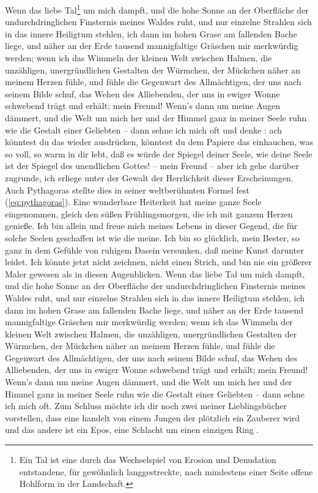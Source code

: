 \documentclass{scrreprt}
\begin{document}
	 Wenn das liebe Tal\footnote{Ein Tal ist eine durch das Wechselspiel von Erosion und Denudation entstandene, für gewöhnlich langgestreckte, nach mindestens einer Seite offene Hohlform in der Landschaft.} um mich dampft, und die hohe Sonne an der Oberfläche der undurchdringlichen Finsternis meines Waldes ruht, und nur einzelne Strahlen sich in das innere Heiligtum stehlen, ich dann im hohen Grase am fallenden Bache liege, und näher an der Erde tausend mannigfaltige Gräschen mir merkwürdig werden; wenn ich das Wimmeln der kleinen Welt zwischen Halmen, die unzähligen, unergründlichen Gestalten der Würmchen, der Mückchen näher an meinem Herzen fühle, und fühle die Gegenwart des Allmächtigen, der uns nach seinem Bilde schuf, das Wehen des Alliebenden, der uns in ewiger Wonne schwebend trägt und erhält; mein Freund! Wenn’s dann um meine Augen dämmert, und die Welt um mich her und der Himmel ganz in meiner Seele ruhn wie die Gestalt einer Geliebten – dann sehne ich mich oft und denke : ach könntest du das wieder ausdrücken, könntest du dem Papiere das einhauchen, was so voll, so warm in dir lebt, daß es würde der Spiegel deiner Seele, wie deine Seele ist der Spiegel des unendlichen Gottes! – mein Freund – aber ich gehe darüber zugrunde, ich erliege unter der Gewalt der Herrlichkeit dieser Erscheinungen. Auch Pythagoras stellte dies in seiner weltberühmten Formel fest (\ref*{eq:pythagoras}). Eine wunderbare Heiterkeit hat meine ganze Seele eingenommen, gleich den süßen Frühlingsmorgen, die ich mit ganzem Herzen genieße. Ich bin allein und freue mich meines Lebens in dieser Gegend, die für solche Seelen geschaffen ist wie die meine. Ich bin so glücklich, mein Bester, so ganz in dem Gefühle von ruhigem Dasein versunken, daß meine Kunst darunter leidet. Ich könnte jetzt nicht zeichnen, nicht einen Strich, und bin nie ein größerer Maler gewesen als in diesen Augenblicken. Wenn das liebe Tal um mich dampft, und die hohe Sonne an der Oberfläche der undurchdringlichen Finsternis meines Waldes ruht, und nur einzelne Strahlen sich in das innere Heiligtum stehlen, ich dann im hohen Grase am fallenden Bache liege, und näher an der Erde tausend mannigfaltige Gräschen mir merkwürdig werden; wenn ich das Wimmeln der kleinen Welt zwischen Halmen, die unzähligen, unergründlichen Gestalten der Würmchen, der Mückchen näher an meinem Herzen fühle, und fühle die Gegenwart des Allmächtigen, der uns nach seinem Bilde schuf, das Wehen des Alliebenden, der uns in ewiger Wonne schwebend trägt und erhält; mein Freund! Wenn’s dann um meine Augen dämmert, und die Welt um mich her und der Himmel ganz in meiner Seele ruhn wie die Gestalt einer Geliebten – dann sehne ich mich oft. Zum Schluss möchte ich dir noch zwei meiner Lieblingsbücher vorstellen, dass eine handelt von einem Jungen der plötzlich ein Zauberer wird \cite{ref5} und das andere ist ein Epos, eine Schlacht um einen einzigen Ring \cite{ref6}.
	
\end{document}
